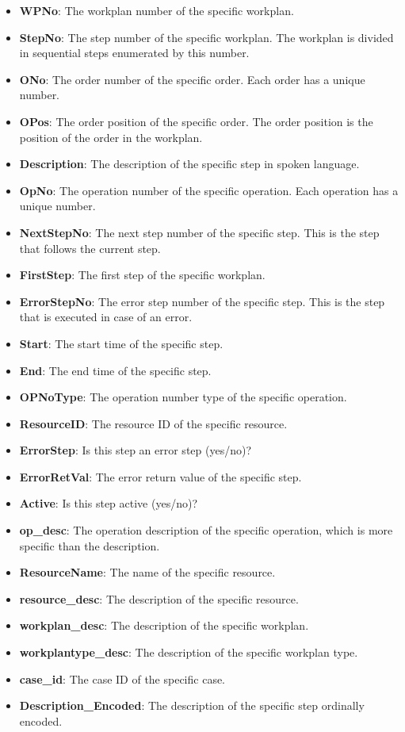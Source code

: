 \begin{itemize}
  \item \textbf{WPNo}: The workplan number of the specific workplan.
  \item \textbf{StepNo}: The step number of the specific workplan. The workplan is divided in sequential steps enumerated by this number.
  \item \textbf{ONo}: The order number of the specific order. Each order has a unique number.
  \item \textbf{OPos}: The order position of the specific order. The order position is the position of the order in the workplan.
  \item \textbf{Description}: The description of the specific step in spoken language.
  \item \textbf{OpNo}: The operation number of the specific operation. Each operation has a unique number.
  \item \textbf{NextStepNo}: The next step number of the specific step. This is the step that follows the current step.
  \item \textbf{FirstStep}: The first step of the specific workplan.
  \item \textbf{ErrorStepNo}: The error step number of the specific step. This is the step that is executed in case of an error.
  \item \textbf{Start}: The start time of the specific step.
  \item \textbf{End}: The end time of the specific step.
  \item \textbf{OPNoType}: The operation number type of the specific operation.
  \item \textbf{ResourceID}: The resource ID of the specific resource.
  \item \textbf{ErrorStep}: Is this step an error step (yes/no)?
  \item \textbf{ErrorRetVal}: The error return value of the specific step.
  \item \textbf{Active}: Is this step active (yes/no)?
  \item \textbf{op\_desc}: The operation description of the specific operation, which is more specific than the description.
  \item \textbf{ResourceName}: The name of the specific resource.
  \item \textbf{resource\_desc}: The description of the specific resource.
  \item \textbf{workplan\_desc}: The description of the specific workplan.
  \item \textbf{workplantype\_desc}: The description of the specific workplan type.
  \item \textbf{case\_id}: The case ID of the specific case.
  \item \textbf{Description\_Encoded}: The description of the specific step ordinally encoded.
\end{itemize}

